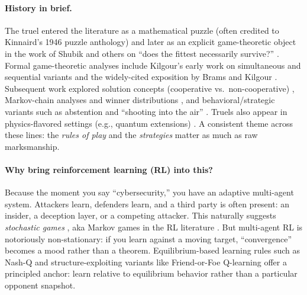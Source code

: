 \documentclass[11pt]{article}
\begin{document}
\paragraph{History in brief.}
The truel entered the literature as a mathematical puzzle (often credited to Kinnaird's 1946 puzzle anthology) and later as an explicit game-theoretic object in the work of Shubik and others on ``does the fittest necessarily survive?'' \citep{Kinnaird1946,Shubik1954,Shubik1982}.
Formal game-theoretic analyses include Kilgour's early work on simultaneous and sequential variants \citep{Kilgour1972} and the widely-cited exposition by Brams and Kilgour \citep{BramsKilgour1997}.
Subsequent work explored solution concepts (cooperative vs.\ non-cooperative) \citep{BossertBramsKilgour2002}, Markov-chain analyses and winner distributions \citep{ToralAmengual2005,AmengualToral2006}, and behavioral/strategic variants such as abstention and ``shooting into the air'' \citep{Xu2012,DorrakiAllisonAbbott2019}.
Truels also appear in physics-flavored settings (e.g., quantum extensions) \citep{FlitneyAbbott2003}.
A consistent theme across these lines: the \emph{rules of play} and the \emph{strategies} matter as much as raw marksmanship.

\paragraph{Why bring reinforcement learning (RL) into this?}
Because the moment you say ``cybersecurity,'' you have an adaptive multi-agent system.
Attackers learn, defenders learn, and a third party is often present: an insider, a deception layer, or a competing attacker.
This naturally suggests \emph{stochastic games} \citep{Shapley1953}, aka Markov games in the RL literature \citep{Littman1994}.
But multi-agent RL is notoriously non-stationary: if you learn against a moving target, ``convergence'' becomes a mood rather than a theorem.
Equilibrium-based learning rules such as Nash-Q \citep{HuWellman2003} and structure-exploiting variants like Friend-or-Foe Q-learning \citep{Littman2001} offer a principled anchor: learn relative to equilibrium behavior rather than a particular opponent snapshot.
\end{document}
